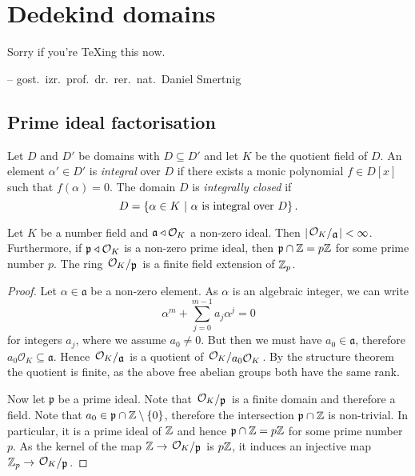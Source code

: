\section{Dedekind domains}

\epigraph{Sorry if you're \TeX{}ing this now.}
{-- gost.~izr.~prof.~dr.~rer.~nat.~Daniel Smertnig}

\subsection{Prime ideal factorisation}


\begin{definicija}
Let $D$ and $D'$ be domains with $D \subseteq D'$ and let $K$ be
the quotient field of $D$. An element $\alpha' \in D'$ is
\emph{integral} over $D$ if there exists a
monic polynomial $f \in D[x]$ such that $f(\alpha) = 0$. The domain
$D$ is \emph{integrally closed} if
\[
D = \left\{\alpha \in K~\middle\vert~\text{$\alpha$ is integral over $D$}\right\}.
\]
\end{definicija}

\begin{lema}
\label{dedek:lm:pr_id_intsc}
Let $K$ be a number field and $\mathfrak{a} \triangleleft \mathcal{O}_K$ a
non-zero ideal. Then
$\abs{\kvoc{\mathcal{O}_K}{\mathfrak{a}}} < \infty$. Furthermore,
if $\mathfrak{p} \triangleleft \mathcal{O}_K$ is a non-zero prime ideal,
then $\mathfrak{p} \cap \mathbb{Z} = p \mathbb{Z}$ for some prime number $p$. The
ring $\kvoc{\mathcal{O}_K}{\mathfrak{p}}$ is a finite field
extension of $\mathbb{Z}_p$.
\end{lema}

\begin{proof}
Let $\alpha \in \mathfrak{a}$ be a non-zero element. As
$\alpha$ is an algebraic integer, we can write
\[
\alpha^m + \sum_{j=0}^{m-1} a_j \alpha^j = 0
\]
for integers $a_j$, where we assume $a_0 \ne 0$. But then
we must have $a_0 \in \mathfrak{a}$, therefore
$a_0 \mathcal{O}_K \subseteq \mathfrak{a}$. Hence
$\kvoc{\mathcal{O}_K}{\mathfrak{a}}$ is a quotient of
$\kvoc{\mathcal{O}_K}{a_0 \mathcal{O}_K}$. By the structure theorem
the quotient is finite, as the above free abelian groups both have
the same rank.

Now let $\mathfrak{p}$ be a prime ideal. Note that
$\kvoc{\mathcal{O}_K}{\mathfrak{p}}$ is a finite domain and
therefore a field. Note that
$a_0 \in \mathfrak{p} \cap \mathbb{Z} \setminus \left\{0\right\}$, therefore the
intersection $\mathfrak{p} \cap \mathbb{Z}$ is non-trivial. In particular,
it is a prime ideal of $\mathbb{Z}$ and hence
$\mathfrak{p} \cap \mathbb{Z} = p \mathbb{Z}$ for some prime number $p$. As the
kernel of the map $\Z \to \kvoc{\mathcal{O}_K}{\mathfrak{p}}$ is
$p \mathbb{Z}$, it induces an injective map
$\Z_p \to \kvoc{\mathcal{O}_K}{\mathfrak{p}}$.
\end{proof}

